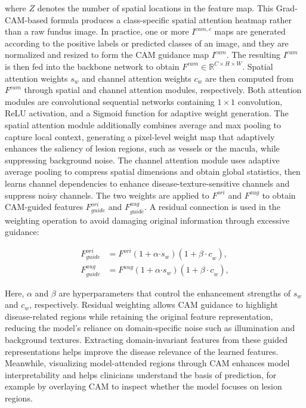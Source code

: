 where \(Z\) denotes the number of spatial locations in the feature map. This Grad-CAM-based formula produces a class-specific spatial attention heatmap rather than a raw fundus image. In practice, one or more \(I^{cam,c}\) maps are generated according to the positive labels or predicted classes of an image, and they are normalized and resized to form the CAM guidance map \(I^{cam}\). The resulting \(I^{cam}\) is then fed into the backbone network to obtain \(F^{cam} \in \mathbb{R}^{C \times H \times W}\). Spatial attention weights \(s_{w}\) and channel attention weights \(c_{w}\) are then computed from \(F^{cam}\) through spatial and channel attention modules, respectively. Both attention modules are convolutional sequential networks containing \(1 \times 1\) convolution, ReLU activation, and a Sigmoid function for adaptive weight generation. The spatial attention module additionally combines average and max pooling to capture local context, generating a pixel-level weight map that adaptively enhances the saliency of lesion regions, such as vessels or the macula, while suppressing background noise. The channel attention module uses adaptive average pooling to compress spatial dimensions and obtain global statistics, then learns channel dependencies to enhance disease-texture-sensitive channels and suppress noisy channels. The two weights are applied to \(F^{ori}\) and \(F^{aug}\) to obtain CAM-guided features \(F_{guide}^{ori}\) and \(F_{guide}^{aug}\). A residual connection is used in the weighting operation to avoid damaging original information through excessive guidance:

\begin{align}
F_{guide}^{ori} &= F^{ori}(1 + \alpha{\cdot s}_{w})(1 + {\beta \cdot c}_{w}), \label{eq:guide-feature-ori} \\
F_{guide}^{aug} &= F^{aug}(1 + \alpha{\cdot s}_{w})(1 + {\beta \cdot c}_{w}), \label{eq:guide-feature-aug}
\end{align}

Here, \(\alpha\) and \(\beta\) are hyperparameters that control the enhancement strengths of \(s_{w}\) and \(c_{w}\), respectively. Residual weighting allows CAM guidance to highlight disease-related regions while retaining the original feature representation, reducing the model's reliance on domain-specific noise such as illumination and background textures. Extracting domain-invariant features from these guided representations helps improve the disease relevance of the learned features. Meanwhile, visualizing model-attended regions through CAM enhances model interpretability and helps clinicians understand the basis of prediction, for example by overlaying CAM to inspect whether the model focuses on lesion regions.

